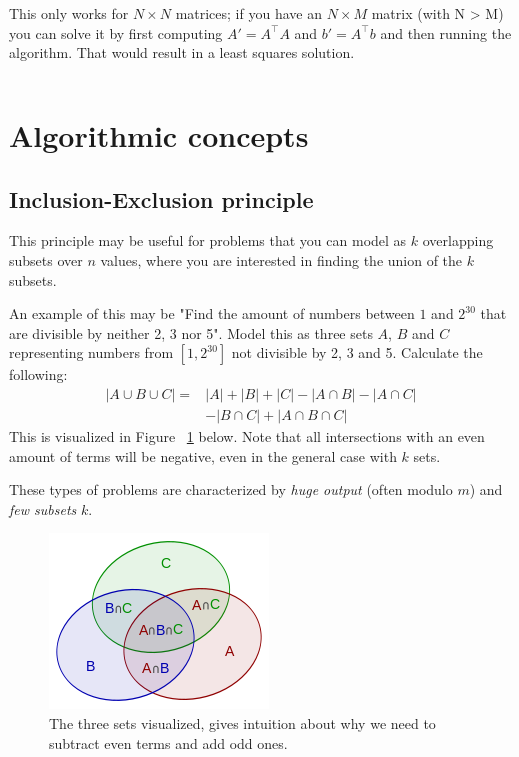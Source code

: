\documentclass[8pt,a4paper,landscape,oneside]{amsart}
\newcommand{\code}[1]{\inputminted[fontsize=\normalsize,baselinestretch=1]{java}{code/#1}}
\begin{document}
\begin{multicols*}{3}
  This only works for $N \times N$ matrices; if you have an $N \times M$ matrix (with N > M) you can solve it by first computing $A' = A^\top A$ and $b' = A^\top b$ and then running the algorithm. That would result in a least squares solution.
  \code{Math/Gauss.java}
  


\section{Algorithmic concepts}
  \subsection{Inclusion-Exclusion principle}
  This principle may be useful for problems that you can model as $k$ overlapping subsets over $n$ values, where you are interested in finding the union of the $k$ subsets.
  
  An example of this may be "Find the amount of numbers between $1$ and $2^{30}$ that are divisible by neither 2, 3 nor 5". Model this as three sets $A$, $B$ and $C$ representing numbers from $[1, 2^{30}]$ not divisible by 2, 3 and 5. Calculate the following:
  \[
  \begin{split}
  |A \cup B \cup C| = & |A| + |B| + |C| - |A \cap B| - |A \cap C| \\
  & - |B \cap C| + |A \cap B \cap C|
  \end{split}
  \]
  This is visualized in Figure ~\ref{inclusion-exclusion} below. Note that all intersections with an even amount of terms will be negative, even in the general case with $k$ sets.
  
  These types of problems are characterized by \emph{huge output} (often modulo $m$) and \emph{few subsets} $k$.
  
  \begin{figure}[H]
  \centering
   \includegraphics[scale=0.5]{inclusion-exclusion_principle.png}
   \caption{The three sets visualized, gives intuition about why we need to subtract even terms and add odd ones.}
   \label{inclusion-exclusion}
  \end{figure}
  

\end{multicols*}
\end{document}
